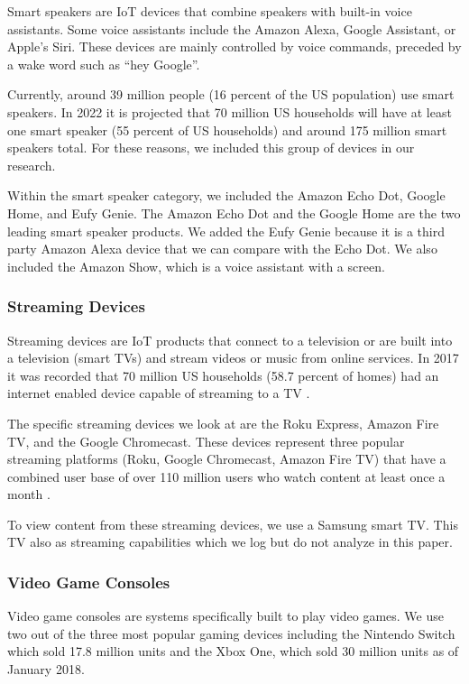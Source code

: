 Smart speakers are IoT devices that combine speakers with built-in voice assistants. Some voice assistants include the Amazon Alexa, Google Assistant, or Apple's Siri. These devices are mainly controlled by voice commands, preceded by a wake word such as ``hey Google''.

Currently, around 39 million people (16 percent of the US population) use smart speakers\cite{perez_2017}. In 2022 it is projected that 70 million US households will have at least one smart speaker (55 percent of US households) and around 175 million smart speakers total\cite{perez_2018}. For these reasons, we included this group of devices in our research.

Within the smart speaker category, we included the Amazon Echo Dot, Google Home, and Eufy Genie. The Amazon Echo Dot and the Google Home are the two leading smart speaker products. We added the Eufy Genie because it is a third party Amazon Alexa device that we can compare with the Echo Dot. We also included the Amazon Show, which is a voice assistant with a screen.

\subsubsection{Streaming Devices}

Streaming devices are IoT products that connect to a television or are built into a television (smart TVs) and stream videos or music from online services. In 2017 it was recorded that 70 million US households (58.7 percent of homes) had an internet enabled device capable of streaming to a TV \cite{lynch_2017}.

The specific streaming devices we look at are the Roku Express, Amazon Fire TV, and the Google Chromecast. These devices represent three popular streaming platforms (Roku, Google Chromecast, Amazon Fire TV) that have a combined user base of over 110 million users who watch content at least once a month \cite{emarketer_2017}.

To view content from these streaming devices, we use a Samsung smart TV. This TV also as streaming capabilities which we log but do not analyze in this paper.

\subsubsection{Video Game Consoles}

Video game consoles are systems specifically built to play video games. We use two out of the three most popular gaming devices including the Nintendo Switch which sold 17.8 million units \cite{nintendo} and the Xbox One, which sold 30 million units \cite{souppouris_2016} as of January 2018.


